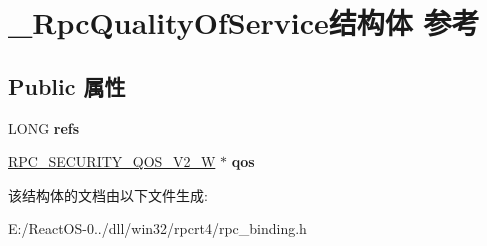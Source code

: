 \hypertarget{struct___rpc_quality_of_service}{}\section{\+\_\+\+Rpc\+Quality\+Of\+Service结构体 参考}
\label{struct___rpc_quality_of_service}
\subsection*{Public 属性}
\begin{DoxyCompactItemize}
\item 
\mbox{\label{struct___rpc_quality_of_service_a4637b048a18b03d42406c55b2e941dae}} 
L\+O\+NG {\bfseries refs}
\item 
\mbox{\label{struct___rpc_quality_of_service_a1f133f46153eb656eb95236952b4ef20}} 
\hyperlink{struct___r_p_c___s_e_c_u_r_i_t_y___q_o_s___v2___w}{R\+P\+C\+\_\+\+S\+E\+C\+U\+R\+I\+T\+Y\+\_\+\+Q\+O\+S\+\_\+\+V2\+\_\+W} $\ast$ {\bfseries qos}
\end{DoxyCompactItemize}


该结构体的文档由以下文件生成\+:\begin{DoxyCompactItemize}
\item 
E\+:/\+React\+O\+S-\/0../dll/win32/rpcrt4/rpc\+\_\+binding.\+h\end{DoxyCompactItemize}
